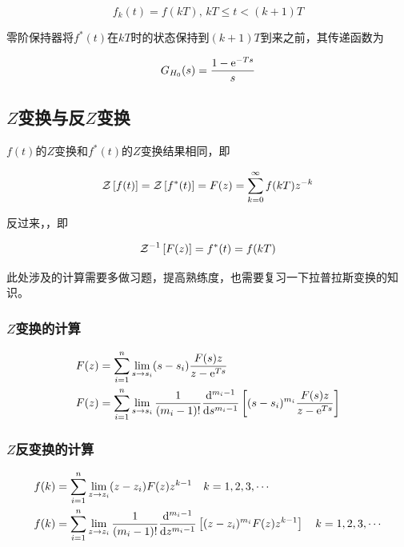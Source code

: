 \begin{equation}
    f_k(t) = f(kT),\,kT \leqslant t < (k+1)T
\end{equation}

零阶保持器将$f^*(t)$在$kT$时的状态保持到$(k+1)T$到来之前，其传递函数为

\begin{equation}
    G_{H_0}(s) = \frac{1-{\rm{e}}^{-Ts}}{s}
\end{equation}

\subsection{$Z$变换与反$Z$变换}

$f(t)$的$Z$变换和$f^*(t)$的$Z$变换结果相同，即

\begin{equation}
    \mathcal{Z}\left[f(t)\right] = \mathcal{Z}\left[f^*(t)\right] = F(z) = \sum_{k=0}^{\infty} f(kT) z^{-k}
\end{equation}

反过来，，即

\begin{equation}
    {\mathcal{Z}}^{-1}\left[F(z)\right] = f^*(t) = f(kT)
\end{equation}

此处涉及的计算需要多做习题，提高熟练度，也需要复习一下拉普拉斯变换的知识。

\subsubsection{$Z$变换的计算}

\begin{align}
    & F(z) = \sum_{i=1}^{n} \lim_{s\to s_i} (s - s_i)\frac{F(s) z}{z - {\rm{e}}^{Ts}} \\
    & F(z) = \sum_{i=1}^{n} \lim_{s\to s_i} \frac{1}{(m_i - 1)!} \frac{{\rm{d}}^{m_i-1}}{{\rm{d}}{s}^{m_i-1}} \left[(s-s_i)^{m_i} \frac{F(s) z}{z - {\rm{e}}^{Ts}}\right]
\end{align}

\subsubsection{$Z$反变换的计算}

\begin{align}
    & f(k) = \sum_{i=1}^{n} \lim_{z\to z_i} (z - z_i) F(z) z^{k-1} \quad k=1, 2, 3, \cdots \\
    & f(k) = \sum_{i=1}^{n} \lim_{z\to z_i} \frac{1}{(m_i - 1)!} \frac{{\rm{d}}^{m_i-1}}{{\rm{d}}{z}^{m_i-1}} \left[(z-z_i)^{m_i} F(z) z^{k-1}\right] \quad k=1, 2, 3, \cdots 
\end{align}


